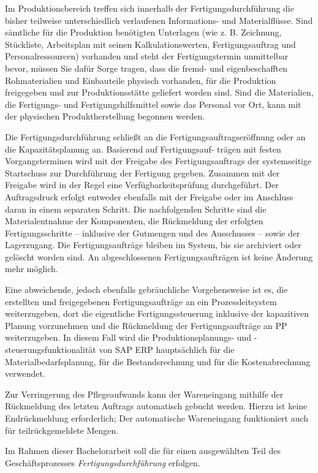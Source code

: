 Im Produktionsbereich treffen sich innerhalb der Fertigungsdurchführung die bisher teilweise unterschiedlich verlaufenen Informations- und Materialflüsse. Sind sämtliche für die Produktion benötigten Unterlagen (wie z. B. Zeichnung, Stückliste, Arbeitsplan mit seinen Kalkulationswerten, Fertigungsauftrag und Personalressourcen) vorhanden und steht der Fertigungstermin unmittelbar bevor, müssen Sie dafür Sorge tragen, dass die fremd- und eigenbeschafften Rohmaterialien und Einbauteile physisch vorhanden, für die Produktion freigegeben und zur Produktionsstätte geliefert worden sind. Sind die Materialien, die Fertigungs- und Fertigungshilfsmittel sowie das Personal vor Ort, kann mit der physischen Produktherstellung begonnen werden.


Die Fertigungsdurchführung schließt an die Fertigungsauftragseröffnung oder an die Kapazitätsplanung an. Basierend auf Fertigungsauf- trägen mit festen Vorgangsterminen wird mit der Freigabe des Fertigungsauftrags der systemseitige Startschuss zur Durchführung der Fertigung gegeben. Zusammen mit der Freigabe wird in der Regel eine Verfügbarkeitsprüfung durchgeführt. Der Auftragsdruck erfolgt entweder ebenfalls mit der Freigabe oder im Anschluss daran in einem separaten Schritt. Die nachfolgenden Schritte sind die Materialentnahme der Komponenten, die Rückmeldung der erfolgten Fertigungsschritte – inklusive der Gutmengen und des Ausschusses – sowie der Lagerzugang. Die Fertigungsaufträge bleiben im System, bis sie archiviert oder gelöscht worden sind. An abgeschlossenen Fertigungsaufträgen ist keine Änderung mehr möglich.

Eine abweichende, jedoch ebenfalls gebräuchliche Vorgehensweise ist es, die erstellten und freigegebenen Fertigungsaufträge an ein Prozessleitsystem weiterzugeben, dort die eigentliche Fertigungssteuerung inklusive der kapazitiven Planung vorzunehmen und die Rückmeldung der Fertigungsaufträge an PP weiterzugeben. In diesem Fall wird die Produktionsplanungs- und -steuerungsfunktionalität von SAP ERP hauptsächlich für die Materialbedarfsplanung, für die Bestandsrechnung und für die Kostenabrechnung verwendet.

Zur Verringerung des Pflegeaufwands kann der Wareneingang mithilfe der Rückmeldung des letzten Auftrags automatisch gebucht werden. Hierzu ist keine Endrückmeldung erforderlich; Der automatische Wareneingang funktioniert auch für teilrückgemeldete Mengen.

Im Rahmen dieser Bachelorarbeit soll die  für einen ausgewählten Teil des Geschäftsprozesses \textit{Fertigungsdurchführung} erfolgen.



